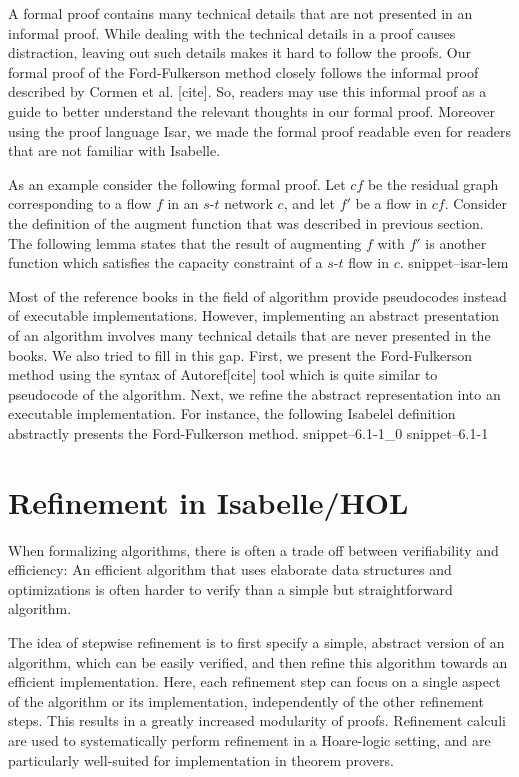 \documentclass{llncs}
\newcommand{\Snippet}[1]{\csname snippet--#1\endcsname}
\begin{document}
A formal proof contains many technical details that are not presented in an informal proof. While dealing with the technical details in a proof causes distraction, leaving out such details makes it hard to follow the proofs. Our formal proof of the Ford-Fulkerson method closely follows the informal proof described by Cormen et al. [cite]. So, readers may use this informal proof as a guide to better understand the relevant thoughts in our formal proof. Moreover using the proof language Isar, we made the formal proof readable even for readers that are not familiar with Isabelle.

As an example consider the following formal proof. Let $cf$ be the residual graph corresponding to a flow $f$ in an $s$-$t$ network $c$, and let $f'$ be a flow in $cf$. Consider the definition of the augment function that was described in previous section. The following lemma states that the result of augmenting $f$ with $f'$ is another function which satisfies the capacity constraint of a $s$-$t$ flow in $c$. 
\Snippet{isar-lem}

Most of the reference books in the field of algorithm provide pseudocodes instead of executable implementations. However, implementing an abstract presentation of 
an algorithm involves many technical details that are never presented in the books. We also tried to fill in this gap. First, we present the Ford-Fulkerson method using the syntax of Autoref[cite] tool which is quite similar to pseudocode of the algorithm. Next, we refine the abstract representation into an executable implementation. For instance, the following Isabelel definition abstractly presents the Ford-Fulkerson method.
\Snippet{6.1-1_0}
\Snippet{6.1-1}


\section{Refinement in Isabelle/HOL}
When formalizing algorithms, there is often a trade off between verifiability 
and efficiency: An efficient algorithm that uses elaborate data structures and optimizations is often harder to 
verify than a simple but straightforward algorithm. 

The idea of stepwise refinement \cite{Wirth} is to first specify a simple, abstract version of an algorithm, which can be easily verified,
and then refine this algorithm towards an efficient implementation. Here, each refinement step can focus on a single aspect of the algorithm or 
its implementation, independently of the other refinement steps. This results in a greatly increased modularity of proofs. 
Refinement calculi \cite{Back} are used to systematically perform refinement in a Hoare-logic setting, and are particularly well-suited for 
implementation in theorem provers. 
\end{document}
